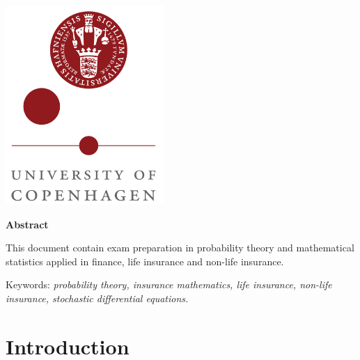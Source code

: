 \documentclass[
]{book}
\begin{document}
{\begin{titlepage}




\includegraphics[width = 0.45\textwidth]{logo_ku.png}%
 

\vfill %
\end{titlepage}

\thispagestyle{empty}
\begin{center}
\textbf{\large Abstract}
\end{center}

This document contain exam preparation in probability theory and mathematical statistics applied in finance, life insurance and non-life insurance.

Keywords: \emph{probability theory, insurance mathematics, life insurance,
non-life insurance, stochastic differential equations.}
\vfill
\pagebreak

\setcounter{tocdepth}{3}
\tableofcontents
}
\thispagestyle{empty}
\newpage
\setcounter{page}{1}
\pagestyle{fancy}
\hypertarget{introduction}{%
\chapter{Introduction}\label{introduction}}
\end{document}
